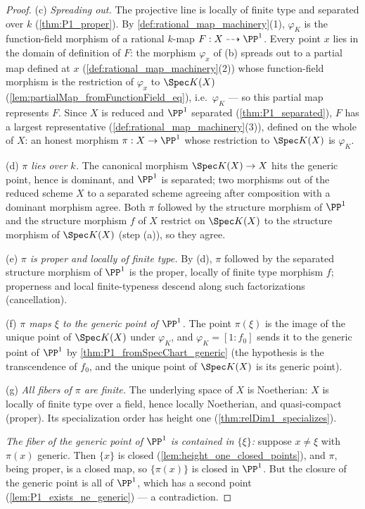 \begin{proof}
  (c) \emph{Spreading out.} The projective line is locally of finite type and separated
  over \(k\) (\ref{thm:P1_proper}). By \ref{def:rational_map_machinery}(1), \(\varphi_K\)
  is the function-field morphism of a rational \(k\)-map
  \(F : X \dashrightarrow \PP^1\). Every point \(x\) lies in the domain of definition of
  \(F\): the morphism \(\varphi_x\) of (b) spreads out to a partial map defined at \(x\)
  (\ref{def:rational_map_machinery}(2)) whose function-field morphism is the restriction
  of \(\varphi_x\) to \(\Spec K(X)\) (\ref{lem:partialMap_fromFunctionField_eq}), i.e.\
  \(\varphi_K\) --- so this partial map represents \(F\). Since \(X\) is reduced and
  \(\PP^1\) separated (\ref{thm:P1_separated}), \(F\) has a largest representative
  (\ref{def:rational_map_machinery}(3)), defined on the whole of \(X\): an honest
  morphism \(\pi : X \to \PP^1\) whose restriction to \(\Spec K(X)\) is \(\varphi_K\).

  (d) \emph{\(\pi\) lies over \(k\).} The canonical morphism \(\Spec K(X) \to X\) hits the
  generic point, hence is dominant, and \(\PP^1\) is separated; two morphisms out of the
  reduced scheme \(X\) to a separated scheme agreeing after composition with a dominant
  morphism agree. Both \(\pi\) followed by the structure morphism of \(\PP^1\) and the
  structure morphism \(f\) of \(X\) restrict on \(\Spec K(X)\) to the structure morphism
  of \(\Spec K(X)\) (step (a)), so they agree.

  (e) \emph{\(\pi\) is proper and locally of finite type.} By (d), \(\pi\) followed by the
  separated structure morphism of \(\PP^1\) is the proper, locally of finite type
  morphism \(f\); properness and local finite-typeness descend along such factorizations
  (cancellation).

  (f) \emph{\(\pi\) maps \(\xi\) to the generic point of \(\PP^1\).} The point
  \(\pi(\xi)\) is the image of the unique point of \(\Spec K(X)\) under \(\varphi_K\),
  and \(\varphi_K = [1 : f_0]\) sends it to the generic point of \(\PP^1\) by
  \ref{thm:P1_fromSpecChart_generic} (the hypothesis is the transcendence of \(f_0\), and
  the unique point of \(\Spec K(X)\) is its generic point).

  (g) \emph{All fibers of \(\pi\) are finite.} The underlying space of \(X\) is Noetherian:
  \(X\) is locally of finite type over a field, hence locally Noetherian, and
  quasi-compact (proper). Its specialization order has height one
  (\ref{thm:relDim1_specializes}).

  \emph{The fiber of the generic point of \(\PP^1\) is contained in \(\{\xi\}\):} suppose
  \(x \neq \xi\) with \(\pi(x)\) generic. Then \(\{x\}\) is closed
  (\ref{lem:height_one_closed_points}), and \(\pi\), being proper, is a closed map, so
  \(\{\pi(x)\}\) is closed in \(\PP^1\). But the closure of the generic point is all of
  \(\PP^1\), which has a second point (\ref{lem:P1_exists_ne_generic}) --- a
  contradiction.


\end{proof}
